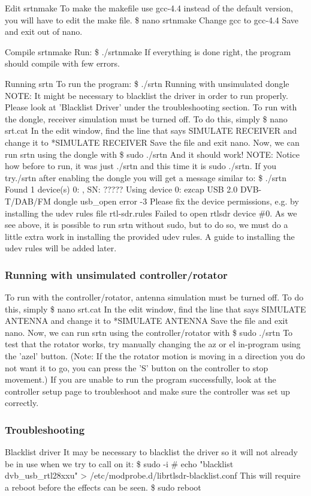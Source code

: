 \documentclass[11pt]{article} %
\begin{document}
Edit srtnmake
To make the makefile use gcc-4.4 instead of the default version, you will have to edit the make file.
\$ nano srtnmake
Change gcc to gcc-4.4
Save and exit out of nano.

Compile srtnmake
Run:
\$ ./srtnmake
If everything is done right, the program should compile with few errors.

Running srtn
To run the program:
\$ ./srtn
Running with unsimulated dongle
NOTE: It might be necessary to blacklist the driver in order to run properly. Please look at 'Blacklist Driver' under the troubleshooting section.
To run with the dongle, receiver simulation must be turned off. To do this, simply
\$ nano srt.cat
In the edit window, find the line that says
SIMULATE RECEIVER
and change it to
*SIMULATE RECEIVER
Save the file and exit nano. Now, we can run srtn using the dongle with
\$ sudo ./srtn
And it should work!
NOTE: Notice how before to run, it was just ./srtn and this time it is sudo ./srtn. If you try./srtn after enabling the dongle you will get a message similar to:
\$ ./srtn
Found 1 device(s)
  0:  ,   SN:  ?????
Using device 0: ezcap USB 2.0 DVB-T/DAB/FM dongle
usb\_open error -3
Please fix the device permissions, e.g. by installing the udev rules file rtl-sdr.rules
Failed to open rtlsdr device \#0.
As we see above, it is possible to run srtn without sudo, but to do so, we must do a little extra work in installing the provided udev rules. A guide to installing the udev rules will be added later.

\subsubsection{Running with unsimulated controller/rotator}
To run with the controller/rotator, antenna simulation must be turned off. To do this, simply
\$ nano srt.cat
In the edit window, find the line that says
SIMULATE ANTENNA
and change it to
*SIMULATE ANTENNA
Save the file and exit nano. Now, we can run srtn using the controller/rotator with
\$ sudo ./srtn
To test that the rotator works, try manually changing the az or el in-program using the 'azel' button. (Note: If the the rotator motion is moving in a direction you do not want it to go, you can press the 'S' button on the controller to stop movement.)
If you are unable to run the program successfully, look at the controller setup page to troubleshoot and make sure the controller was set up correctly.

\subsubsection{Troubleshooting}
Blacklist driver
It may be necessary to blacklist the driver so it will not already be in use when we try to call on it:
\$ sudo -i
\# echo "blacklist dvb\_usb\_rtl28xxu" > /etc/modprobe.d/librtlsdr-blacklist.conf
This will require a reboot before the effects can be seen.
\$ sudo reboot
\end{document}
